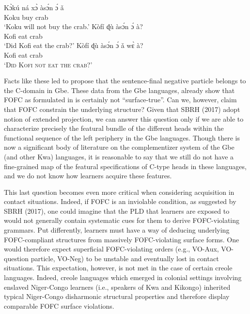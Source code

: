 \documentclass[output=paper]{langsci/langscibook}
\begin{document}
\ea\label{ex:aboh:14.3} 
    \ea\label{ex:aboh:14.3a}
        \gll    K\`ɔkú ná x\`ɔ às\'ɔn \'ɔ \v{a} \\
                Koku \Fut{} buy crab \Det{} \Neg{} \\
        \glt    \enquote*{Koku will not buy the crab.}
    \ex\label{ex:aboh:14.3b}
        \gll    Kòfí ɖù às\'ɔn \'ɔ à? \\
                Kofi eat crab \Det{} \glossQ{} \\
        \glt    \enquote*{Did Kofi eat the crab?}
    \ex\label{ex:aboh:14.3c}
        \gll    Kòfí ɖù às\'ɔn \'ɔ \v{a} w\`ɛ à? \\
                Kofi eat crab \Det{} \Neg{} \Foc{} \glossQ{}\\
        \glt    \enquote*{\textsc{Did Kofi not eat the crab?}}
    \z
\z

Facts like these led \citet{Aboh2010a} to propose that the sentence-final
negative particle belongs to the C-domain in Gbe. These data from the Gbe
languages, already show that \gls{FOFC} as formulated in  is certainly
not “surface-true”. Can we, however, claim that \gls{FOFC} constrain the underlying
structure? Given that SBRH (2017) adopt  notion of extended
projection, we can answer this question only if we are able to characterize
precisely the featural bundle of the different heads within the functional
sequence of the left periphery in the Gbe languages. Though there is now a
significant body of literature on the complementizer system of the Gbe (and
other Kwa) languages, it is reasonable to say that we still do not have a
fine-grained map of the featural specifications of C-type heads in these
languages, and we do not know how learners acquire these features.\largerpage[-1]

This last question becomes even more critical when considering acquisition in
contact situations. Indeed, if \gls{FOFC} is an inviolable condition, as suggested by
SBRH (2017), one could imagine that the \gls{PLD} that learners are
exposed to would not generally contain systematic cues for them to derive
FOFC-violating grammars. Put differently, learners must have a way of deducing
underlying FOFC-compliant structures from massively FOFC-violating surface
forms. One would therefore expect superficial FOFC-violating orders (e.g.,
VO-Aux, VO-question particle, VO-Neg) to be unstable and eventually lost in
contact situations. This expectation, however, is not met in the case of
certain creole languages. Indeed, creole languages which emerged in colonial
settings involving enslaved Niger-Congo learners (i.e., speakers of Kwa and
Kikongo) inherited typical Niger-Congo disharmonic structural properties and
therefore display comparable \gls{FOFC} surface violations.
\end{document}
